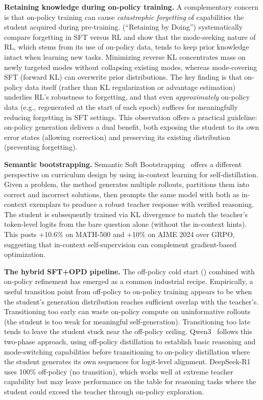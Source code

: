 \documentclass{article} %
\begin{document}
\textbf{Retaining knowledge during on-policy training.} A complementary concern is that on-policy training can cause \emph{catastrophic forgetting} of capabilities the student acquired during pre-training. \citet{2510.18874} (``Retaining by Doing'') systematically compare forgetting in SFT versus RL and show that the mode-seeking nature of RL, which stems from its use of on-policy data, tends to keep prior knowledge intact when learning new tasks. Minimizing reverse KL concentrates mass on newly targeted modes without collapsing existing modes, whereas mode-covering SFT (forward KL) can overwrite prior distributions. The key finding is that on-policy data itself (rather than KL regularization or advantage estimation) underlies RL's robustness to forgetting, and that even \emph{approximately} on-policy data (e.g., regenerated at the start of each epoch) suffices for meaningfully reducing forgetting in SFT settings. This observation offers a practical guideline: on-policy generation delivers a dual benefit, both exposing the student to its own error states (allowing correction) and preserving its existing distribution (preventing forgetting).

\textbf{Semantic bootstrapping.} Semantic Soft Bootstrapping~\citep{2512.05105} offers a different perspective on curriculum design by using in-context learning for self-distillation. Given a problem, the method generates multiple rollouts, partitions them into correct and incorrect solutions, then prompts the same model with both as in-context exemplars to produce a robust teacher response with verified reasoning. The student is subsequently trained via KL divergence to match the teacher's token-level logits from the bare question alone (without the in-context hints). This posts +10.6\% on MATH-500 and +10\% on AIME 2024 over GRPO, suggesting that in-context self-supervision can complement gradient-based optimization.

\textbf{The hybrid SFT+OPD pipeline.} The off-policy cold start (\citet{2604.13016}) combined with on-policy refinement has emerged as a common industrial recipe. Empirically, a useful transition point from off-policy to on-policy training appears to be when the student's generation distribution reaches sufficient overlap with the teacher's. Transitioning too early can waste on-policy compute on uninformative rollouts (the student is too weak for meaningful self-generation). Transitioning too late tends to leave the student stuck near the off-policy ceiling. Qwen3~\citep{2505.09388} follows this two-phase approach, using off-policy distillation to establish basic reasoning and mode-switching capabilities before transitioning to on-policy distillation where the student generates its own sequences for logit-level alignment. DeepSeek-R1~\citep{2501.12948} uses 100\% off-policy (no transition), which works well at extreme teacher capability but may leave performance on the table for reasoning tasks where the student could exceed the teacher through on-policy exploration.
\end{document}
